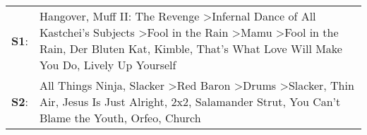 \begin{supertabular}{p{0.03\textwidth}p{0.92\textwidth}}
 \textbf{S1}:  &  Hangover\textsuperscript{}, \enspace Muff II: The Revenge\textsuperscript{} \textgreater \enspace Infernal Dance of All Kastchei's Subjects\textsuperscript{} \textgreater \enspace Fool in the Rain\textsuperscript{} \textgreater \enspace Mamu\textsuperscript{} \textgreater \enspace Fool in the Rain\textsuperscript{}, \enspace Der Bluten Kat\textsuperscript{}, \enspace Kimble\textsuperscript{}, \enspace That's What Love Will Make You Do\textsuperscript{}, \enspace Lively Up Yourself\textsuperscript{}  \enspace  \\
 \textbf{S2}:  &    All Things Ninja\textsuperscript{}, \enspace Slacker\textsuperscript{} \textgreater \enspace Red Baron\textsuperscript{} \textgreater \enspace Drums\textsuperscript{} \textgreater \enspace Slacker\textsuperscript{}, \enspace Thin Air\textsuperscript{}, \enspace Jesus Is Just Alright\textsuperscript{}, \enspace 2x2\textsuperscript{}, \enspace Salamander Strut\textsuperscript{}, \enspace You Can't Blame the Youth\textsuperscript{}, \enspace Orfeo\textsuperscript{}, \enspace Church\textsuperscript{}  \enspace  \\
\end{supertabular}
